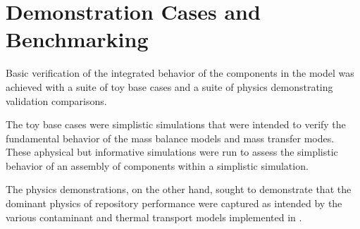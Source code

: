 \chapter{Demonstration Cases and Benchmarking}\label{ch:demonstration}

Basic verification of the integrated behavior of the components in the \Cyder 
model was achieved with a suite of toy base cases and a suite of physics 
demonstrating validation comparisons. 

The toy base cases were simplistic simulations that were intended 
to verify the fundamental behavior of the mass balance models and mass transfer 
modes. These aphysical but informative simulations were run to assess the simplistic 
behavior of an assembly of \Cyder components within a simplistic \Cyclus 
simulation.

The physics demonstrations, on the other hand, sought to demonstrate that the 
dominant physics of repository performance were captured as intended by the 
various contaminant and thermal transport models implemented in \Cyder.




